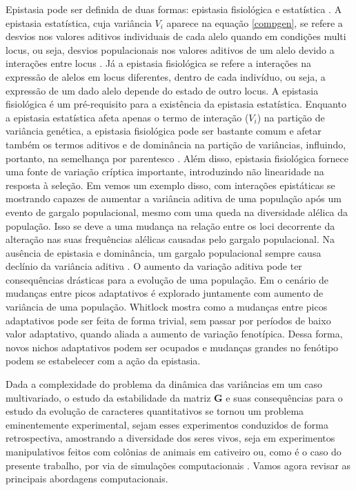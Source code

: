 Epistasia pode ser definida de duas formas: epistasia fisiológica e
estatística \citep{Cheverud1995}.
A epistasia estatística, cuja variância $V_i$ aparece na equação
\ref{compgen}, se refere a desvios nos valores aditivos individuais de
cada alelo quando em condições multi locus, ou seja, desvios
populacionais nos valores aditivos de um alelo devido a interações entre locus
\citep{Falconer1996}.
Já a epistasia fisiológica se refere a interações na expressão de alelos
em locus diferentes, dentro de cada indivíduo, ou seja, a expressão de
um dado alelo depende do estado de outro locus.
A epistasia fisiológica é um pré-requisito para a existência da 
epistasia estatística.
Enquanto a epistasia estatística afeta apenas o termo de interação
($V_i$) na partição de variância genética, a epistasia fisiológica pode
ser bastante comum e afetar também os termos aditivos e de dominância na
partição de variâncias, influindo, portanto, na semelhança por
parentesco \citep{Crow1970, Falconer1996, Cheverud1995, Cheverud1996a}.
Além disso, epistasia fisiológica fornece uma fonte de variação críptica
importante, introduzindo não linearidade na resposta à seleção.
Em \cite{Cheverud1996a} vemos um exemplo disso, com interações
epistáticas se mostrando capazes de aumentar a variância aditiva de uma
população após um evento de gargalo populacional, mesmo com uma queda na
diversidade alélica da população.
Isso se deve a uma mudança na relação entre os loci decorrente da
alteração nas suas frequências alélicas causadas pelo gargalo
populacional.
Na ausência de epistasia e dominância, um gargalo populacional sempre
causa declínio da variância aditiva \citep{Falconer1996}.
O aumento da variação aditiva pode ter consequências drásticas para a
evolução de uma população.
Em \cite{Whitlock1995} o cenário de mudanças entre picos adaptativos é
explorado juntamente com aumento de variância de uma população. 
Whitlock mostra como a mudanças entre picos adaptativos pode ser
feita de forma trivial, sem passar por períodos de baixo valor
adaptativo, quando aliada a aumento de variação fenotípica. 
Dessa forma, novos nichos adaptativos podem ser ocupados e mudanças
grandes no fenótipo podem se estabelecer com a ação da epistasia.

Dada a complexidade do problema da dinâmica das variâncias em um caso
multivariado, o estudo da estabilidade da matriz $\mathbf{G}$ e suas consequências
para o estudo da evolução de caracteres quantitativos se tornou um
problema eminentemente experimental, sejam esses experimentos conduzidos
de forma retrospectiva, amostrando a diversidade dos seres vivos, seja
em experimentos manipulativos feitos com colônias de animais em
cativeiro ou, como é o caso do presente trabalho, por via de simulações
computacionais \citep[para uma revisão sobre estabilidade da matriz $\mathbf{G}$
veja][]{Arnold2008}.
Vamos agora revisar as principais abordagens computacionais.

